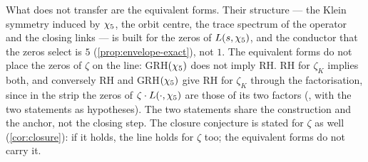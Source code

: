 What does not transfer are the equivalent forms.  Their structure --- the Klein symmetry induced
by $\chi_5$, the orbit centre, the trace spectrum of the operator and the closing links
--- is built for the zeros of $L(s,\chi_5)$, and the conductor that the zeros select is
$5$ (\cref{prop:envelope-exact}), not $1$.  The equivalent forms do not place the zeros of
$\zeta$ on the line: GRH$(\chi_5)$ does not imply RH.  RH for $\zeta_K$ implies both, and conversely RH and
GRH$(\chi_5)$ give RH for $\zeta_K$ through the factorisation, since in the strip the zeros of
$\zeta\cdot L(\cdot,\chi_5)$ are those of its two factors (, with the two statements as hypotheses).  The two statements share the construction and the anchor, not
the closing step.  The closure conjecture is stated for $\zeta$ as well (\cref{cor:closure}): if it
holds, the line holds for $\zeta$ too; the equivalent forms do not carry it.


